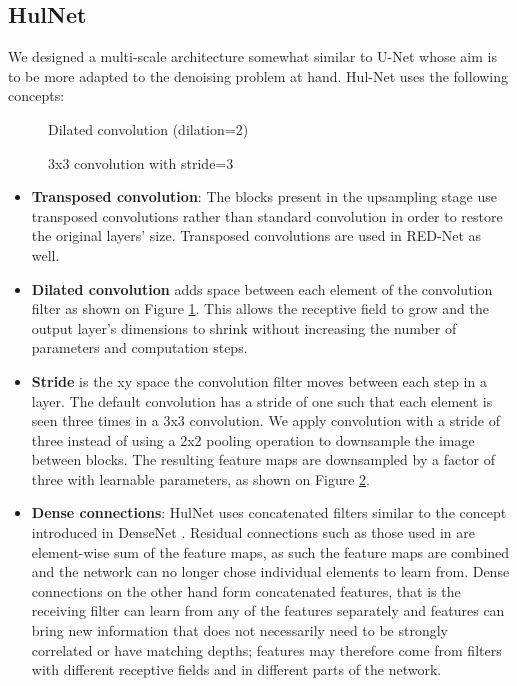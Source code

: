 \subsection{HulNet}
We designed a multi-scale architecture somewhat similar to U-Net whose aim is to be more adapted to the denoising problem at hand. Hul-Net uses the following concepts:
\begin{figure}
  \begin{center}
    \caption{Dilated convolution (dilation=2)}
    \label{fig:dilated}
  \end{center}
\end{figure}
\begin{figure}
  \begin{center}
      
    \caption{3x3 convolution with stride=3}
    \label{fig:str3}
  \end{center}
\end{figure}
\begin{itemize}
  \item \textbf{Transposed convolution}: The blocks present in the upsampling stage use transposed convolutions rather than standard convolution in order to restore the original layers' size. Transposed convolutions are used in RED-Net as well.
  \item \textbf{Dilated convolution} adds space between each element of the convolution filter as shown on Figure \ref{fig:dilated}. This allows the receptive field to grow and the output layer's dimensions to shrink without increasing the number of parameters and computation steps.
  \item \textbf{Stride} is the xy space the convolution filter moves between each step in a layer. The default convolution has a stride of one such that each element is seen three times in a 3x3 convolution. We apply convolution with a stride of three instead of using a 2x2 pooling operation to downsample the image between blocks. The resulting feature maps are downsampled by a factor of three with learnable parameters, as shown on Figure \ref{fig:str3}.
  \item \textbf{Dense connections}: HulNet uses concatenated filters similar to the concept introduced in DenseNet \cite{densenet}. Residual connections such as those used in \cite{rednet}\cite{unet} are element-wise sum of the feature maps, as such the feature maps are combined and the network can no longer chose individual elements to learn from. Dense connections on the other hand form concatenated features, that is the receiving filter can learn from any of the features separately and features can bring new information that does not necessarily need to be strongly correlated or have matching depths; features may therefore come from filters with different receptive fields and in different parts of the network.
\end{itemize}
